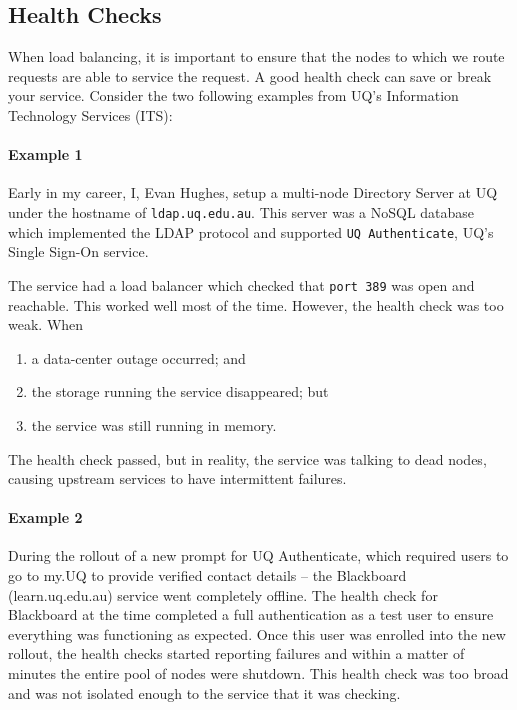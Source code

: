 \documentclass{csse4400}
\begin{document}
\subsection{Health Checks}

When load balancing, it is important to ensure that the nodes to which we route requests are able to service the request.
A good health check can save or break your service.
Consider the two following examples from UQ's Information Technology Services (ITS):

\paragraph{Example 1} Early in my career, I, Evan Hughes, setup a multi-node Directory Server at UQ under the hostname of \texttt{ldap.uq.edu.au}.
This server was a NoSQL database which implemented the LDAP protocol and supported \texttt{UQ Authenticate},
UQ's Single Sign-On service.

The service had a load balancer which checked that \texttt{port 389} was open and reachable. 
This worked well most of the time.
However, the health check was too weak. When
\begin{enumerate} 
    \item a data-center outage occurred; and
    \item the storage running the service disappeared; but 
    \item the service was still running in memory.
\end{enumerate}

The health check passed, but in reality, the service was talking to dead nodes, causing upstream services to have intermittent failures. 

\paragraph{Example 2} During the rollout of a new prompt for UQ Authenticate, which required users to go to my.UQ to provide verified contact details -- the Blackboard (learn.uq.edu.au) service went completely offline.
The health check for Blackboard at the time completed a full authentication as a test user to ensure everything was functioning as expected.
Once this user was enrolled into the new rollout,
the health checks started reporting failures and within a matter of minutes the entire pool of nodes were shutdown.
This health check was too broad and was not isolated enough to the service that it was checking.
\end{document}
